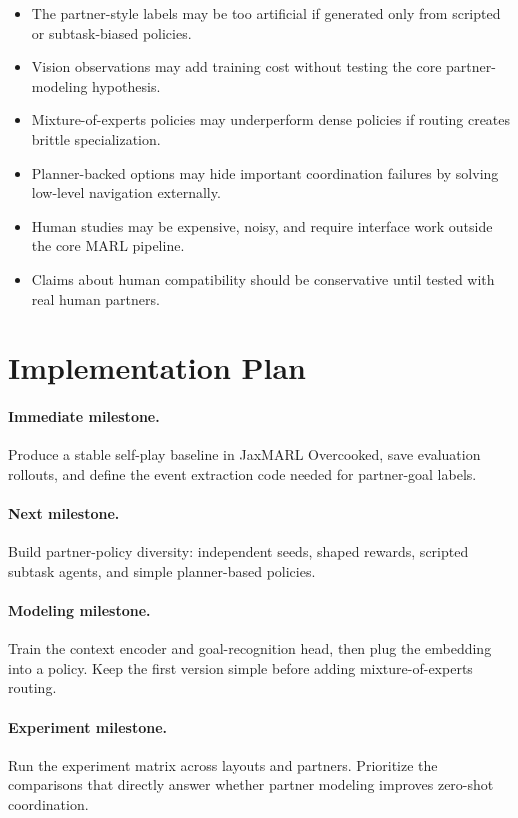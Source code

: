 \documentclass[letterpaper]{article} %
\begin{document}
\begin{itemize}
    \item The partner-style labels may be too artificial if generated only from scripted or subtask-biased policies.
    \item Vision observations may add training cost without testing the core partner-modeling hypothesis.
    \item Mixture-of-experts policies may underperform dense policies if routing creates brittle specialization.
    \item Planner-backed options may hide important coordination failures by solving low-level navigation externally.
    \item Human studies may be expensive, noisy, and require interface work outside the core MARL pipeline.
    \item Claims about human compatibility should be conservative until tested with real human partners.
\end{itemize}

\section{Implementation Plan}

\paragraph{Immediate milestone.}
Produce a stable self-play baseline in JaxMARL Overcooked, save evaluation rollouts, and define the event extraction code needed for partner-goal labels.

\paragraph{Next milestone.}
Build partner-policy diversity: independent seeds, shaped rewards, scripted subtask agents, and simple planner-based policies.

\paragraph{Modeling milestone.}
Train the context encoder and goal-recognition head, then plug the embedding into a policy. Keep the first version simple before adding mixture-of-experts routing.

\paragraph{Experiment milestone.}
Run the experiment matrix across layouts and partners. Prioritize the comparisons that directly answer whether partner modeling improves zero-shot coordination.
\end{document}
